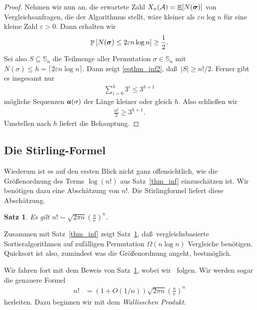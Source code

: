 \documentclass[10pt,reqno]{amsart}
\numberwithin{equation}{section}
\renewcommand\subset{\subseteq}
\newcommand\cA{\mathcal A}
\newcommand\va{\vec a}
\renewcommand\SS{\mathbb S}
\def\vec#1{\mathchoice{\mbox{\boldmath$\displaystyle#1$}}
{\mbox{\boldmath$\textstyle#1$}}
{\mbox{\boldmath$\scriptstyle#1$}}
{\mbox{\boldmath$\scriptscriptstyle#1$}}}
\DeclareMathOperator{\ex}{\mathbb E}
\DeclareMathOperator{\pr}{\mathbb P}
\newtheorem{theorem}[definition]{Satz}
\newcommand\eul{\mathrm{e}}
\newcommand\eps{\varepsilon}
\newcommand\bc[1]{\left({#1}\right)}
\newcommand\bcfr[2]{\bc{\frac{#1}{#2}}}
\newcommand\brk[1]{\left\lbrack{#1}\right\rbrack}
\newcommand\Thm{Satz}
\begin{document}
\begin{proof}
	Nehmen wir nun an, die erwartete Zahl $X_n(\cA)=\ex[N(\vec\sigma)]$ von Vergleichsanfragen, die der Algorithmus stellt, w\"are kleiner als $\eps n\log n$ f\"ur eine kleine Zahl $\eps>0$.
	Dann erhalten wir
	\begin{align}\label{eqthm_inf2}
		\pr\brk{N(\vec\sigma)\leq2\eps n\log n}\geq\frac12.
	\end{align}
	Sei also $S\subset\SS_n$ die Teilmenge aller Permutation $\sigma\in\SS_n$ mit $N(\sigma)\leq h=\lceil 2\eps n\log n\rceil$.
	Dann zeigt \eqref{eqthm_inf2}, da\ss\ $|S|\geq n!/2$.
	Ferner gibt es insgesamt nur 
	\begin{align*}
		\sum_{i=0}^h3^i\leq 3^{h+1}
	\end{align*}
	m\"ogliche Sequenzen $\va(\sigma)$ der L\"ange kleiner oder gleich $h$.
	Also schlie\ss en wir
	\begin{align*}
		\frac{n!}2\geq 3^{h+1}.
	\end{align*}
	Umstellen nach $h$ liefert die Behauptung.
\end{proof}

\subsection{Die Stirling-Formel}\label{sec_stirling}
Wiederum ist es auf den ersten Blick nicht ganz offensichtlich, wie die Gr\"o\ss enordnung des Terms $\log(n!)$ aus \Thm~\ref{thm_inf} einzusch\"atzen ist.
Wir ben\"otigen dazu eine Absch\"atzung von $n!$.
Die Stirlingformel liefert diese Absch\"atzung.

\begin{theorem}\label{thm_stirling}
	Es gilt $n!\sim\sqrt{2\pi n}\bcfr n\eul^n$.
\end{theorem}

Zusammen mit \Thm~\ref{thm_inf} zeigt \Thm~\ref{thm_stirling}, da\ss\ vergleichsbasierte Sortieralgorithmen auf zuf\"alligen Permutation $\Omega(n\log n)$ Vergleiche ben\"otigen.
Quicksort ist also, zumindest was die Gr\"o\ss enordnung angeht, bestm\"oglich.

Wir fahren fort mit dem Beweis von \Thm~\ref{thm_stirling}, wobei wir~\cite{Lang} folgen.
Wir werden sogar die genauere Formel
\begin{align*}
	n!&=(1+O(1/n))\sqrt{2\pi n}\bcfr n\eul^n
\end{align*}
herleiten.
Dazu beginnen wir mit dem {\em Wallisschen Produkt}.
\end{document}
